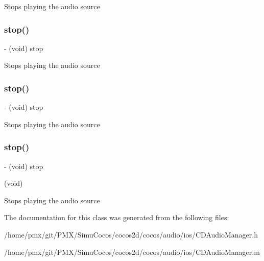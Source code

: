 Stops playing the audio source \mbox{\label{interfaceCDLongAudioSource_ae77879d7c0e770cf58f8b8fb27cc29d4}} 
\subsubsection{\texorpdfstring{stop()}{stop()}\hspace{0.1cm}{\footnotesize\ttfamily [2/4]}}
{\footnotesize\ttfamily -\/ (void) stop \begin{DoxyParamCaption}{ }\end{DoxyParamCaption}}

Stops playing the audio source \mbox{\label{interfaceCDLongAudioSource_ae77879d7c0e770cf58f8b8fb27cc29d4}} 
\subsubsection{\texorpdfstring{stop()}{stop()}\hspace{0.1cm}{\footnotesize\ttfamily [3/4]}}
{\footnotesize\ttfamily -\/ (void) stop \begin{DoxyParamCaption}{ }\end{DoxyParamCaption}}

Stops playing the audio source \mbox{\label{interfaceCDLongAudioSource_ae77879d7c0e770cf58f8b8fb27cc29d4}} 
\subsubsection{\texorpdfstring{stop()}{stop()}\hspace{0.1cm}{\footnotesize\ttfamily [4/4]}}
{\footnotesize\ttfamily -\/ (void) stop \begin{DoxyParamCaption}\item[{(void)}]{ }\end{DoxyParamCaption}}

Stops playing the audio source 

The documentation for this class was generated from the following files\+:\begin{DoxyCompactItemize}
\item 
/home/pmx/git/\+P\+M\+X/\+Simu\+Cocos/cocos2d/cocos/audio/ios/C\+D\+Audio\+Manager.\+h\item 
/home/pmx/git/\+P\+M\+X/\+Simu\+Cocos/cocos2d/cocos/audio/ios/C\+D\+Audio\+Manager.\+m\end{DoxyCompactItemize}
